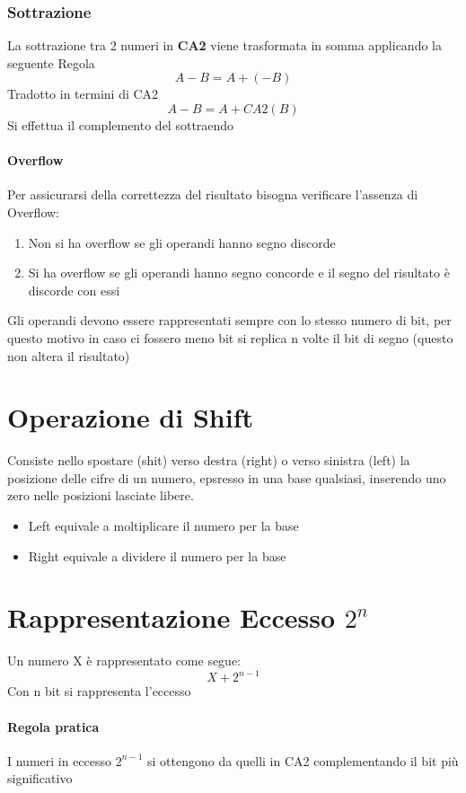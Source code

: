 \documentclass[12pt, a4paper, openany]{book}
\begin{document}
\subsubsection{Sottrazione}
La sottrazione tra 2 numeri in \textbf{CA2} viene trasformata in somma applicando la seguente Regola
\begin{equation}
    A-B=A+(-B)
\end{equation}
Tradotto in termini di CA2
\begin{equation}
    A-B=A+CA2(B)
\end{equation}
Si effettua il complemento del sottraendo
\paragraph{Overflow} Per assicurarsi della correttezza del risultato bisogna verificare l'assenza di 
Overflow:
\begin{enumerate}
    \item Non si ha overflow se gli operandi hanno segno discorde
    \item Si ha overflow se gli operandi hanno segno concorde e il segno del risultato è discorde con essi
\end{enumerate}
Gli operandi devono essere rappresentati sempre con lo stesso numero di bit, per questo motivo
in caso ci fossero meno bit si replica n volte il bit di segno (questo non altera il risultato)

\section{Operazione di Shift}
Consiste nello spostare (shit) verso destra (right) o verso sinistra (left) la posizione delle cifre di un numero, epsresso in una base qualsiasi, inserendo uno zero
nelle posizioni lasciate libere.
\begin{itemize}
    \item Left equivale a moltiplicare il numero per la base
    \item Right equivale a dividere il numero per la base
\end{itemize}
\section*{Rappresentazione Eccesso $2^n$}
Un numero X è rappresentato come segue:
\begin{equation}
    X+2^{n-1}
\end{equation}
Con n bit si rappresenta l'eccesso
\paragraph{Regola pratica} I numeri in eccesso $2^{n-1}$ si ottengono da quelli in CA2
complementando il bit più significativo
\end{document}
